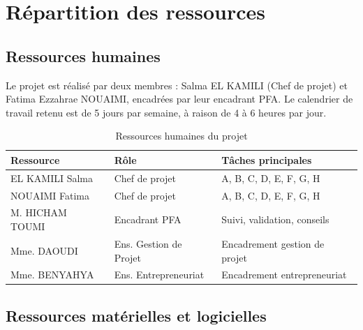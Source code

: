 \documentclass[12pt,a4paper]{report}
\newcommand{\hdr}[1]{\cellcolor{gray!15}\textbf{#1}}
\newcommand{\rowA}{\rowcolor{gray!8}}
\begin{document}
\section{Répartition des ressources}

\subsection{Ressources humaines}

Le projet est réalisé par deux membres : Salma EL KAMILI (Chef de projet) et Fatima Ezzahrae NOUAIMI,
encadrées par leur encadrant PFA. Le calendrier de travail retenu est de 5 jours par semaine,
à raison de 4 à 6 heures par jour.

\begin{table}[H]
\centering
\caption{Ressources humaines du projet}
\begin{tabular}{p{4.5cm}p{3.5cm}p{5cm}}
\toprule
\hdr{Ressource} & \hdr{Rôle} & \hdr{Tâches principales} \\
\midrule
EL KAMILI Salma & Chef de projet & A, B, C, D, E, F, G, H \\
\rowA NOUAIMI Fatima & Chef de projet & A, B, C, D, E, F, G, H \\
M. HICHAM TOUMI & Encadrant PFA & Suivi, validation, conseils \\
\rowA Mme. DAOUDI & Ens. Gestion de Projet & Encadrement gestion de projet \\
Mme. BENYAHYA & Ens. Entrepreneuriat & Encadrement entrepreneuriat \\
\bottomrule
\end{tabular}
\end{table}

\subsection{Ressources matérielles et logicielles}
\end{document}
